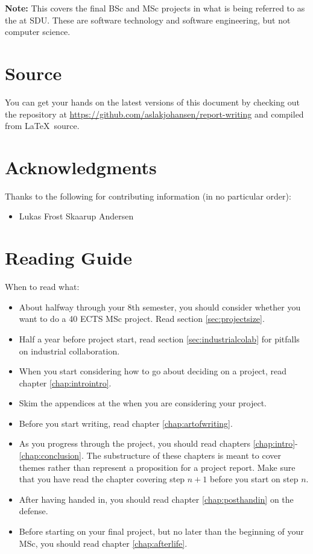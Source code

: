 \documentclass[a4paper, oneside]{memoir}
\newcommand{\quoted}[1]{\textsl{\say{#1}}}
\begin{document}
\textbf{Note:} This covers the final BSc and MSc projects in what is being referred to as the \quoted{software educations} at SDU. These are software technology and software engineering, but not computer science.

\section{Source}
\label{sec:source}

You can get your hands on the latest versions of this document by checking out the repository at \url{https://github.com/aslakjohansen/report-writing} and compiled from \LaTeX\ source.

\section{Acknowledgments}

Thanks to the following for contributing information (in no particular order):
\begin{itemize}
  \item Lukas Frost Skaarup Andersen %
\end{itemize}

\section{Reading Guide}

When to read what:
\begin{itemize}
  \item About halfway through your 8th semester, you should consider whether you want to do a 40 ECTS MSc project. Read section \ref{sec:projectsize}.
  \item Half a year before project start, read section \ref{sec:industrialcolab} for pitfalls on industrial collaboration.
  \item When you start considering how to go about deciding on a project, read chapter \ref{chap:introintro}.
  \item Skim the appendices at the when you are considering your project.
  \item Before you start writing, read chapter \ref{chap:artofwriting}.
  \item As you progress through the project, you should read chapters \ref{chap:intro}-\ref{chap:conclusion}. The substructure of these chapters is meant to cover themes rather than represent a proposition for a project report. Make sure that you have read the chapter covering step $n+1$ before you start on step $n$.
  \item After having handed in, you should read chapter \ref{chap:posthandin} on the defense.
  \item Before starting on your final project, but no later than the beginning of your MSc, you should read chapter \ref{chap:afterlife}.
\end{itemize}
\end{document}
